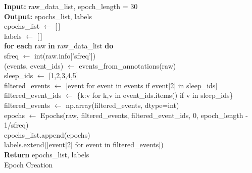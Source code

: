 \begin{algorithm}
	\textbf{Input:} raw\_data\_list, epoch\_length = 30\\
	\textbf{Output:} epochs\_list, labels\\
	
	epochs\_list $\gets$ [\,]\\
	labels $\gets$ [\,]\\
	\textbf{for each} raw \textbf{in} raw\_data\_list \textbf{do}\\
	\hspace{1cm} sfreq $\gets$ int(raw.info['sfreq'])\\
	\hspace{1cm} (events, event\_ids) $\gets$ events\_from\_annotations(raw)\\
	\hspace{1cm} sleep\_ids $\gets$ [1,2,3,4,5]\\
	\hspace{1cm} filtered\_events $\gets$ [event for event in events if event[2] in sleep\_ids]\\
	\hspace{1cm} filtered\_event\_ids $\gets$ \{k:v for k,v in event\_ids.items() if v in sleep\_ids\}\\
	\hspace{1cm} filtered\_events $\gets$ np.array(filtered\_events, dtype=int)\\
	\hspace{1cm} epochs $\gets$ Epochs(raw, filtered\_events, filtered\_event\_ids, 0, epoch\_length - 1/sfreq)\\
	\hspace{1cm} epochs\_list.append(epochs)\\
	\hspace{1cm} labels.extend([event[2] for event in filtered\_events])\\
	\textbf{Return} epochs\_list, labels\\
	\caption{Epoch Creation}
\end{algorithm}

